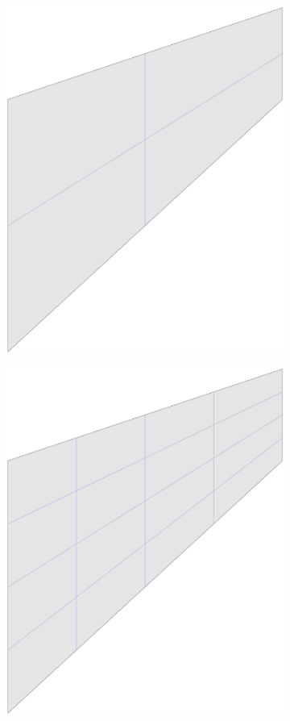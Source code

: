 \begin{figure}[htb!]
\begin{subfigure}[b]{0.18\linewidth}
        \includegraphics[width=\linewidth]{mesh_cook_1}
    \end{subfigure}
    \begin{subfigure}[b]{0.18\linewidth}        %
        \centering
        \includegraphics[width=\linewidth]{mesh_cook_2}

\end{subfigure}
\end{figure}

